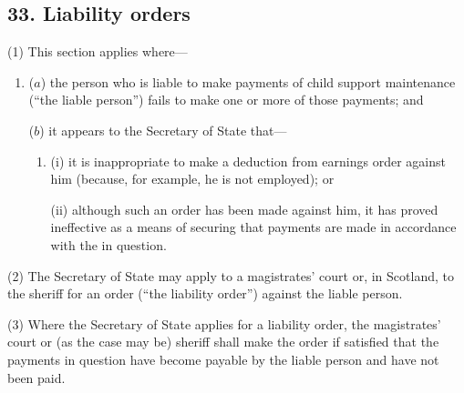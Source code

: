 \documentclass[12pt,a4paper]{article}
\begin{document}

\subsection{33. Liability orders}

(1) This section applies where---
\begin{enumerate}\item[]
($a$) the person who is liable to make payments of child support maintenance (“the liable person”) fails to make one or more of those payments; and

($b$) it appears to the Secretary of State that---
\begin{enumerate}\item[]
(i)
it is inappropriate to make a deduction from earnings order against him (because, for example, he is not employed); or

(ii)
although such an order has been made against him, it has proved ineffective as a means of securing that payments are made in accordance with the  in question.
\end{enumerate}
\end{enumerate}

(2)
The Secretary of State may apply to a magistrates’ court or, in Scotland, to the sheriff for an order (“the liability order”) against the liable person.

(3)
Where the Secretary of State applies for a liability order, the magistrates’ court or (as the case may be) sheriff shall make the order if satisfied that the payments in question have become payable by the liable person and have not been paid.
\end{document}
